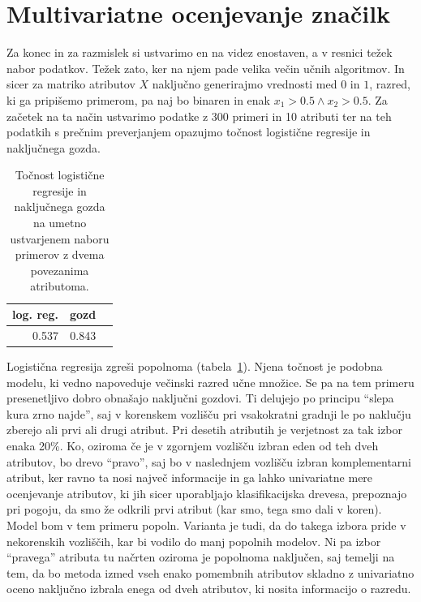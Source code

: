\section{Multivariatne ocenjevanje značilk}

Za konec in za razmislek si ustvarimo en na videz enostaven, a v resnici težek nabor podatkov. Težek zato, ker na njem pade velika večin učnih algoritmov. In sicer za matriko atributov $X$ naključno generirajmo vrednosti med $0$ in $1$, razred, ki ga pripišemo primerom, pa naj bo binaren in enak $x_1>0.5\land x_2>0.5$. Za začetek na ta način ustvarimo podatke z 300 primeri in 10 atributi ter na teh podatkih s prečnim preverjanjem opazujmo točnost logistične regresije in naključnega gozda.

\begin{table}[htbp]
  \begin{center}
    \begin{tabular}{rrr}
      \toprule
      log. reg. & gozd \\
      \midrule
      0.537 & 0.843 \\
      \bottomrule
    \end{tabular}
  \end{center}
  \caption{Točnost logistične regresije in naključnega gozda na umetno ustvarjenem naboru primerov z dvema povezanima atributoma.}
  \label{t:fss-xor}
\end{table}

Logistična regresija zgreši popolnoma (tabela~\ref{t:fss-xor}). Njena točnost je podobna modelu, ki vedno napoveduje večinski razred učne množice. Se pa na tem primeru presenetljivo dobro obnašajo naključni gozdovi. Ti delujejo po principu ``slepa kura zrno najde'', saj v korenskem vozlišču pri vsakokratni gradnji le po naklučju zberejo ali prvi ali drugi atribut. Pri desetih atributih je verjetnost za tak izbor enaka 20\%. Ko, oziroma če je v zgornjem vozlišču izbran eden od teh dveh atributov, bo drevo ``pravo'', saj bo v naslednjem vozlišču izbran komplementarni atribut, ker ravno ta nosi največ informacije in ga lahko univariatne mere ocenjevanje atributov, ki jih sicer uporabljajo klasifikacijska drevesa, prepoznajo pri pogoju, da smo že odkrili prvi atribut (kar smo, tega smo dali v koren). Model bom v tem primeru popoln. Varianta je tudi, da do takega izbora pride v nekorenskih vozliščih, kar bi vodilo do manj popolnih modelov. Ni pa izbor ``pravega'' atributa tu načrten oziroma je popolnoma naključen, saj temelji na tem, da bo metoda izmed vseh enako pomembnih atributov skladno z univariatno oceno naključno izbrala enega od dveh atributov, ki nosita informacijo o razredu.

